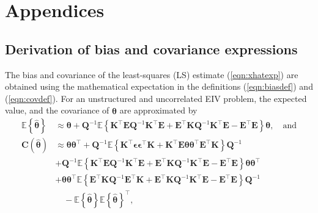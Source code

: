 \glsresetall

\chapter{Appendices}\label{chap:Appendices}
\vfill{} 


\section{Derivation of bias and covariance expressions  \label{appendix:biascovSEIV} }

The bias and covariance of the least-squares (LS) estimate (\ref{eqn:xhatexp}) are obtained using the mathematical expectation in the definitions (\ref{eqn:biasdef}) and (\ref{eqn:covdef}).
For an unstructured and uncorrelated EIV problem, the expected value, and the covariance of $\widehat{\bm{\theta}}$ are approximated by
\begin{equation} \begin{aligned} \mathbb{E} \left\{ \widehat{\bm{\theta}} \right\} & \approx \bm{\theta}  + \mathbf{Q}^{-1} \mathbb{E} \left\{ \mathbf{K}^\top \mathbf{E} \mathbf{Q}^{-1} \mathbf{K}^\top \mathbf{E} + \mathbf{E}^\top \mathbf{K} \mathbf{Q}^{-1} \mathbf{K}^\top \mathbf{E} - \mathbf{E}^\top \mathbf{E}  \right\} \bm{\theta}, \quad \text{and}  \\ 
\mathbf{C} \left( \widehat{\bm{\theta}} \right)  & \approx \bm{\theta} \bm{\theta}^\top + \mathbf{Q}^{-1} \mathbb{E} \left\{ \mathbf{K}^\top \bm{\epsilon} \bm{\epsilon}^\top \mathbf{K} + \mathbf{K}^\top \mathbf{E} \bm{\theta} \bm{\theta}^\top \mathbf{E}^\top \mathbf{K} \right\} \mathbf{Q}^{-1} \\ 
& + \mathbf{Q}^{-1} \mathbb{E} \left\{ \mathbf{K}^\top \mathbf{E} \mathbf{Q}^{-1} \mathbf{K}^\top \mathbf{E} + \mathbf{E}^\top \mathbf{K} \mathbf{Q}^{-1} \mathbf{K}^\top \mathbf{E} - \mathbf{E}^\top \mathbf{E} \right\} \bm{\theta} \bm{\theta}^\top \\
& + \bm{\theta} \bm{\theta}^\top \mathbb{E} \left\{ \mathbf{E}^\top \mathbf{K} \mathbf{Q}^{-1} \mathbf{E}^\top \mathbf{K} + \mathbf{E}^\top \mathbf{K} \mathbf{Q}^{-1} \mathbf{K}^\top \mathbf{E} - \mathbf{E}^\top \mathbf{E} \right\} \mathbf{Q}^{-1} \\
& \quad - \mathbb{E} \left\{ \widehat{\bm{\theta}} \right\} \mathbb{E} \left\{ \widehat{\bm{\theta}} \right\}^\top , \label{eqn:EC_Eu} \end{aligned} \end{equation} 
